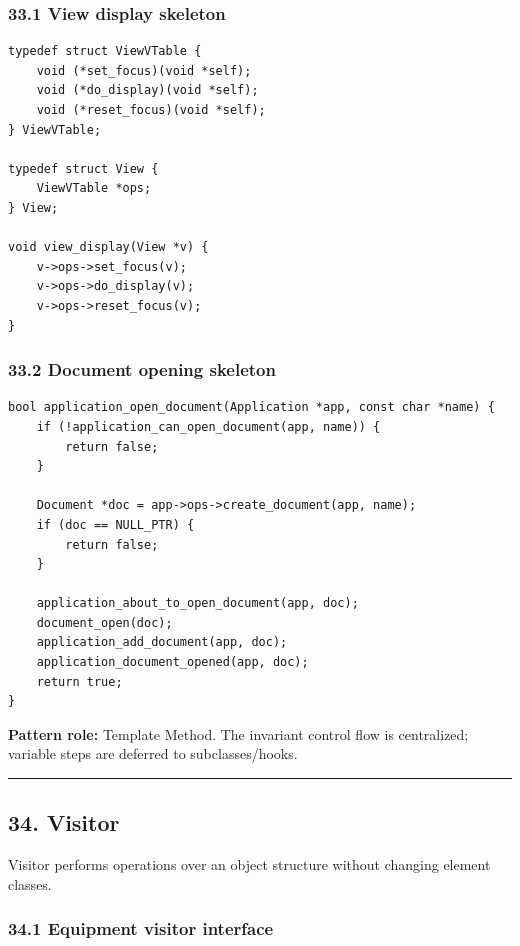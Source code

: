 \documentclass[11pt]{article}
\begin{document}
\subsubsection{33.1 View display skeleton}\label{view-display-skeleton}

\begin{verbatim}
typedef struct ViewVTable {
    void (*set_focus)(void *self);
    void (*do_display)(void *self);
    void (*reset_focus)(void *self);
} ViewVTable;

typedef struct View {
    ViewVTable *ops;
} View;

void view_display(View *v) {
    v->ops->set_focus(v);
    v->ops->do_display(v);
    v->ops->reset_focus(v);
}
\end{verbatim}

\subsubsection{33.2 Document opening skeleton}\label{document-opening-skeleton}

\begin{verbatim}
bool application_open_document(Application *app, const char *name) {
    if (!application_can_open_document(app, name)) {
        return false;
    }

    Document *doc = app->ops->create_document(app, name);
    if (doc == NULL_PTR) {
        return false;
    }

    application_about_to_open_document(app, doc);
    document_open(doc);
    application_add_document(app, doc);
    application_document_opened(app, doc);
    return true;
}
\end{verbatim}

\textbf{Pattern role:} Template Method. The invariant control flow is centralized; variable steps are deferred to subclasses/hooks.

\begin{center}\rule{0.5\linewidth}{0.5pt}\end{center}

\subsection{34. Visitor}\label{visitor}

Visitor performs operations over an object structure without changing element classes.

\subsubsection{34.1 Equipment visitor interface}\label{equipment-visitor-interface}
\end{document}
